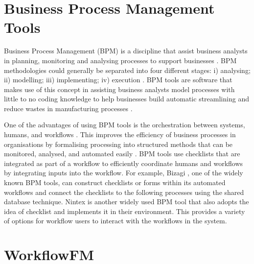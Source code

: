 \section{Business Process Management Tools}
Business Process Management (BPM) is a discipline that assist business analysts in planning, monitoring and analysing processes to support businesses \cite{bpmdefinition}. BPM methodologies could generally be separated into four different stages: i) analysing; ii) modelling; iii) implementing; iv) execution \cite{bpmlifecycles, bpmlifecycles3, bpmlifecycles2}.
BPM tools are software that makes use of this concept in assisting business analysts model processes with little to no coding knowledge to help businesses build automatic streamlining and reduce wastes in manufacturing processes 
\cite{bpmtoolwaste}.

One of the advantages of using BPM tools is the orchestration between systems, humans, and workflows \cite{bpmstrength}.
This improves the efficiency of business processes in organisations by formalising processing into structured methods that can be monitored, analysed, and automated easily \cite{bpmbenefits}.
BPM tools use checklists that are integrated as part of a workflow to efficiently coordinate humans and workflows by integrating inputs into the workflow. For example, Bizagi \cite{bizagi}, one of the widely known BPM tools, can construct checklists or forms within its automated workflows and connect the checklists to the following processes using the shared database technique. Nintex \cite{nintext} is another widely used BPM tool that also adopts the idea of checklist and implements it in their environment. This provides a variety of options for workflow users to interact with the workflows in the system.


\section{WorkflowFM}
\label{background:workflowfm}

